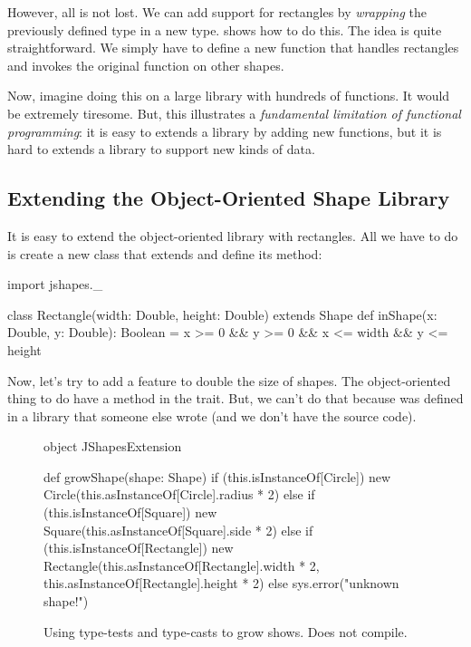 \documentclass{book}
\begin{document}
However, all is not lost. We can add support for rectangles by \emph{wrapping}
the previously defined  type in a new type. 
shows how to do this. The idea is quite straightforward. We simply
have to define a new  function that handles rectangles
and invokes the original  function on other shapes.

Now, imagine doing this on a large library with hundreds of functions. It would
be extremely tiresome. But, this illustrates a \emph{fundamental limitation of
functional programming}: it is easy to extends a library by adding new
functions, but it is hard to extends a library to support new kinds of data.

\subsection{Extending the Object-Oriented Shape Library}

It is easy to extend the object-oriented library with rectangles. All we
have to do is create a new class that extends 
and define its  method:
%
\begin{scalacode}
import jshapes._

class Rectangle(width: Double, height: Double) extends Shape {
  def inShape(x: Double, y: Double): Boolean = x >= 0 && y >= 0 && x <= width && y <= height
}
\end{scalacode}

Now, let's try to add a feature to double the size of shapes. The object-oriented
thing to do have a  method in the 
trait. But, we can't do that because  was defined in
a library that someone else wrote (and we don't have the source code).

\begin{figure}
\begin{scalacode}
object JShapesExtension {

  def growShape(shape: Shape) {
    if (this.isInstanceOf[Circle]) {
      new Circle(this.asInstanceOf[Circle].radius * 2)
    }
    else if (this.isInstanceOf[Square]) {
      new Square(this.asInstanceOf[Square].side * 2)
    }
    else if (this.isInstanceOf[Rectangle]) {
      new Rectangle(this.asInstanceOf[Rectangle].width * 2,
                    this.asInstanceOf[Rectangle].height * 2)
    }
    else {
      sys.error("unknown shape!")
    }
  }

}
\end{scalacode}
\caption{Using type-tests and type-casts to grow shows. Does not compile.}
\label{jshapesext1}
\end{figure}
\end{document}

